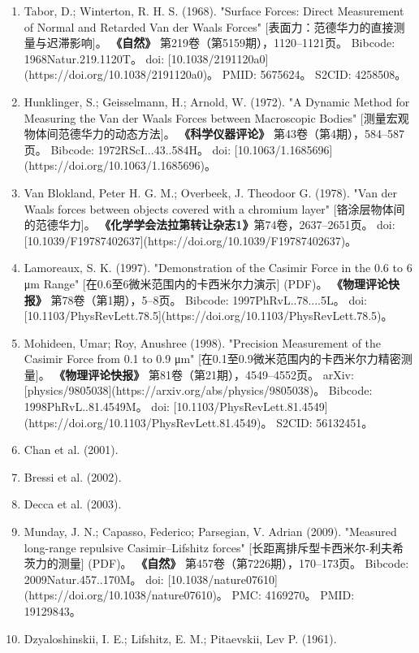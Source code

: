 \begin{enumerate}
\item Tabor, D.; Winterton, R. H. S. (1968).  
  "Surface Forces: Direct Measurement of Normal and Retarded Van der Waals Forces" [表面力：范德华力的直接测量与迟滞影响]。  
  \textbf{《自然》} 第219卷（第5159期），1120–1121页。  
  Bibcode: 1968Natur.219.1120T。  
  doi: [10.1038/2191120a0](https://doi.org/10.1038/2191120a0)。  
  PMID: 5675624。  
  S2CID: 4258508。  
\item Hunklinger, S.; Geisselmann, H.; Arnold, W. (1972).  
  "A Dynamic Method for Measuring the Van der Waals Forces between Macroscopic Bodies" [测量宏观物体间范德华力的动态方法]。  
  \textbf{《科学仪器评论》} 第43卷（第4期），584–587页。  
  Bibcode: 1972RScI...43..584H。  
  doi: [10.1063/1.1685696](https://doi.org/10.1063/1.1685696)。  
\item Van Blokland, Peter H. G. M.; Overbeek, J. Theodoor G. (1978).  
  "Van der Waals forces between objects covered with a chromium layer" [铬涂层物体间的范德华力]。  
  \textbf{《化学学会法拉第转让杂志1》}第74卷，2637–2651页。  
  doi: [10.1039/F19787402637](https://doi.org/10.1039/F19787402637)。  
\item Lamoreaux, S. K. (1997). 
  "Demonstration of the Casimir Force in the 0.6 to 6 μm Range" [在0.6至6微米范围内的卡西米尔力演示] (PDF)。  
  \textbf{《物理评论快报》} 第78卷（第1期），5–8页。  
  Bibcode: 1997PhRvL..78....5L。  
  doi: [10.1103/PhysRevLett.78.5](https://doi.org/10.1103/PhysRevLett.78.5)。  
\item Mohideen, Umar; Roy, Anushree (1998). 
  "Precision Measurement of the Casimir Force from 0.1 to 0.9 μm" [在0.1至0.9微米范围内的卡西米尔力精密测量]。  
  \textbf{《物理评论快报》} 第81卷（第21期），4549–4552页。  
  arXiv: [physics/9805038](https://arxiv.org/abs/physics/9805038)。  
  Bibcode: 1998PhRvL..81.4549M。  
  doi: [10.1103/PhysRevLett.81.4549](https://doi.org/10.1103/PhysRevLett.81.4549)。  
  S2CID: 56132451。  
\item Chan et al. (2001).  
\item Bressi et al. (2002).  
\item Decca et al. (2003).  
\item Munday, J. N.; Capasso, Federico; Parsegian, V. Adrian (2009).  
  "Measured long-range repulsive Casimir–Lifshitz forces" [长距离排斥型卡西米尔-利夫希茨力的测量] (PDF)。  
  \textbf{《自然》} 第457卷（第7226期），170–173页。  
  Bibcode: 2009Natur.457..170M。  
  doi: [10.1038/nature07610](https://doi.org/10.1038/nature07610)。  
  PMC: 4169270。  
  PMID: 19129843。  
\item Dzyaloshinskii, I. E.; Lifshitz, E. M.; Pitaevskii, Lev P. (1961). 

\end{enumerate}
